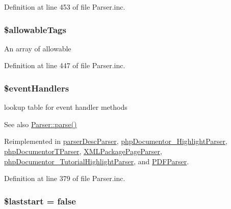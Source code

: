 \-Definition at line 453 of file \-Parser.\-inc.

\hypertarget{class_parser_a0f1e79866b590e0d4be6061432507e4b}{
\subsubsection[{\$allowable\-Tags}]{\setlength{\rightskip}{0pt plus 5cm}\$allowable\-Tags}}\label{class_parser_a0f1e79866b590e0d4be6061432507e4b}
\-An array of allowable  

\-Definition at line 447 of file \-Parser.\-inc.

\hypertarget{class_parser_a430675102684e9ab820c7622678832b0}{
\subsubsection[{\$event\-Handlers}]{\setlength{\rightskip}{0pt plus 5cm}\$event\-Handlers}}\label{class_parser_a430675102684e9ab820c7622678832b0}
lookup table for event handler methods \begin{DoxySeeAlso}{\-See also}
\hyperlink{class_parser_a20139dbf0050f44b70e34bf32d89d7e4}{\-Parser\-::parse()} 
\end{DoxySeeAlso}


\-Reimplemented in \hyperlink{classparser_desc_parser_a430675102684e9ab820c7622678832b0}{parser\-Desc\-Parser}, \hyperlink{classphp_documentor___highlight_parser_a430675102684e9ab820c7622678832b0}{php\-Documentor\-\_\-\-Highlight\-Parser}, \hyperlink{classphp_documentor_t_parser_a430675102684e9ab820c7622678832b0}{php\-Documentor\-T\-Parser}, \hyperlink{class_x_m_l_package_page_parser_a430675102684e9ab820c7622678832b0}{\-X\-M\-L\-Package\-Page\-Parser}, \hyperlink{classphp_documentor___tutorial_highlight_parser_a430675102684e9ab820c7622678832b0}{php\-Documentor\-\_\-\-Tutorial\-Highlight\-Parser}, and \hyperlink{class_p_d_f_parser_a430675102684e9ab820c7622678832b0}{\-P\-D\-F\-Parser}.



\-Definition at line 379 of file \-Parser.\-inc.

\hypertarget{class_parser_aaf46b0cdcfd0148052e26e1b97971b0b}{
\subsubsection[{\$laststart}]{\setlength{\rightskip}{0pt plus 5cm}\$laststart = false}}\label{class_parser_aaf46b0cdcfd0148052e26e1b97971b0b}


